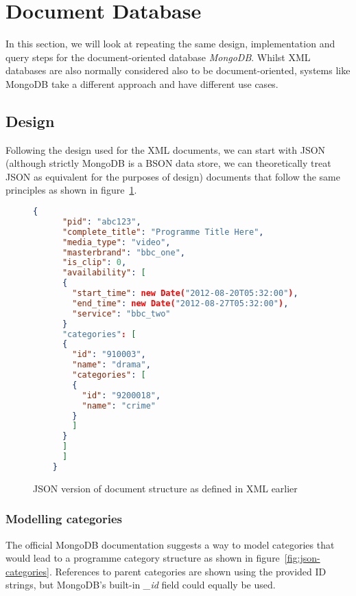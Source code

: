 \documentclass[11pt,a4paper]{article}
\begin{document}

\section{Document Database}

In this section, we will look at repeating the same design, implementation
and query steps for the document-oriented database \emph{MongoDB}. Whilst
XML databases are also normally considered also to be document-oriented,
systems like MongoDB take a different approach and have different use
cases.

\subsection{Design}

Following the design used for the XML documents, we can start with
JSON (although strictly MongoDB is a BSON data store, we can theoretically
treat JSON as equivalent for the purposes of design)
documents that follow the same principles as shown in figure~\ref{fig:big-json-doc}.

\begin{figure}[p]
  \begin{lstlisting}[language=json]
    {
      "pid": "abc123",
      "complete_title": "Programme Title Here",
      "media_type": "video",
      "masterbrand": "bbc_one",
      "is_clip": 0,
      "availability": [
      {
        "start_time": new Date("2012-08-20T05:32:00"),
        "end_time": new Date("2012-08-27T05:32:00"),
        "service": "bbc_two"
      }
      "categories": [
      {
        "id": "910003",
        "name": "drama",
        "categories": [
        {
          "id": "9200018",
          "name": "crime"
        }
        ]
      }
      ]
      ]
    }
  \end{lstlisting}
  \caption{JSON version of document structure as defined in XML earlier}
  \label{fig:big-json-doc}
\end{figure}

\subsubsection{Modelling categories}
\label{sec:mongo-design-categories}

The official MongoDB documentation\cite{mongo-categories} suggests
a way to model categories that would lead to a programme category
structure as shown in figure~\ref{fig:json-categories}. References
to parent categories are shown using the provided ID strings, but
MongoDB's built-in \emph{\_id} field could equally be used.
\end{document}
